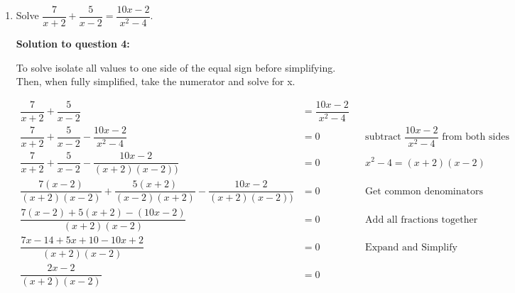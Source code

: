 \documentclass[12pt]{book}
\begin{document}
\begin{enumerate}
\begin{proof}
    \begin{align*}
        g(x) &= x^3 + 2x^2 + cx + d && \text{Original equation}\\
        g(x) &= x^3 + 2x^2 - 2x + 2 && \text{Since }c = -2, d = 2\\
        g(2) &= 2^3 + 2\times 2^2 - 2\times 2 + 2 && \text{Substitute x as 2}\\
        14 &= 2^3 + 2\times 2^2 - 2\times 2 + 2 && g(2) = 14\\
        14 &= 8 + 8 - 4 + 2\\
        14 &= 14 \\
        LHS &= RHS && \qedhere\\
    \end{align*}
\end{proof}

\vspace{-1cm}
$$\therefore \text{the values of c and d found are correct}$$

\newpage

\item Solve $\dfrac{7}{x+2} + \dfrac{5}{x-2} = \dfrac{10x-2}{x^2 - 4}$.

\vspace{0.5cm} 
\textbf{Solution to question 4:}

\vspace{0.3cm} 
To solve isolate all values to one side of the equal sign before simplifying. Then, when fully simplified, take the numerator and solve for x.

\begin{align*}
    \dfrac{7}{x+2} + \dfrac{5}{x-2} &= \dfrac{10x-2}{x^2 - 4} \\
    \dfrac{7}{x+2} + \dfrac{5}{x-2} - \dfrac{10x-2}{x^2 - 4} &= 0 && \text{subtract } \dfrac{10x-2}{x^2 - 4} \text{ from both sides}\\
    \dfrac{7}{x+2} + \dfrac{5}{x-2} - \dfrac{10x-2}{(x+2)(x-2))} &= 0 && x^2-4 = (x+2)(x-2)\\
    \dfrac{7(x-2)}{(x+2)(x-2)} + \dfrac{5(x+2)}{(x-2)(x+2)} - \dfrac{10x-2}{(x+2)(x-2))} &= 0 && \text{Get common denominators} \\
    \dfrac{7(x-2)+5(x+2)-(10x-2)}{(x+2)(x-2)} &= 0 && \text{Add all fractions together}\\
    \dfrac{7x-14+5x+10-10x+2}{(x+2)(x-2)} &= 0 && \text{Expand and Simplify}\\
    \dfrac{2x-2}{(x+2)(x-2)} &= 0\\
\end{align*}


\end{enumerate}
\end{document}
